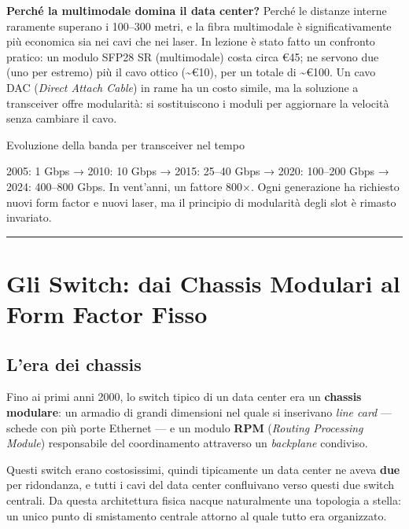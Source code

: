 \documentclass[
  italian,
  openany]{book}
\begin{document}
\textbf{Perché la multimodale domina il data center?} Perché le distanze
interne raramente superano i 100--300 metri, e la fibra multimodale è
significativamente più economica sia nei cavi che nei laser. In lezione
è stato fatto un confronto pratico: un modulo SFP28 SR (multimodale)
costa circa €45; ne servono due (uno per estremo) più il cavo ottico
(\textasciitilde€10), per un totale di \textasciitilde€100. Un cavo DAC
(\emph{Direct Attach Cable}) in rame ha un costo simile, ma la soluzione
a transceiver offre modularità: si sostituiscono i moduli per aggiornare
la velocità senza cambiare il cavo.

\begin{callouttip}{Evoluzione della banda per transceiver nel tempo}

2005: 1 Gbps → 2010: 10 Gbps → 2015: 25--40 Gbps → 2020: 100--200 Gbps →
2024: 400--800 Gbps. In vent'anni, un fattore 800×. Ogni generazione ha
richiesto nuovi form factor e nuovi laser, ma il principio di modularità
degli slot è rimasto invariato.

\end{callouttip}

\begin{center}\rule{0.5\linewidth}{0.5pt}\end{center}

\section{Gli Switch: dai Chassis Modulari al Form Factor
Fisso}\label{gli-switch-dai-chassis-modulari-al-form-factor-fisso}

\subsection{L'era dei chassis}\label{lera-dei-chassis}

Fino ai primi anni 2000, lo switch tipico di un data center era un
\textbf{chassis modulare}: un armadio di grandi dimensioni nel quale si
inserivano \emph{line card} --- schede con più porte Ethernet --- e un
modulo \textbf{RPM} (\emph{Routing Processing Module}) responsabile del
coordinamento attraverso un \emph{backplane} condiviso.

Questi switch erano costosissimi, quindi tipicamente un data center ne
aveva \textbf{due} per ridondanza, e tutti i cavi del data center
confluivano verso questi due switch centrali. Da questa architettura
fisica nacque naturalmente una topologia a stella: un unico punto di
smistamento centrale attorno al quale tutto era organizzato.
\end{document}
